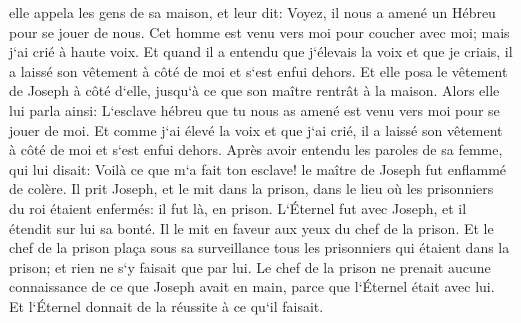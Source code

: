 \verse elle appela les gens de sa maison, et leur dit: Voyez, il nous a amené un Hébreu pour se jouer de nous. Cet homme est venu vers moi pour coucher avec moi; mais j`ai crié à haute voix. 
\verse Et quand il a entendu que j`élevais la voix et que je criais, il a laissé son vêtement à côté de moi et s`est enfui dehors. 
\verse Et elle posa le vêtement de Joseph à côté d`elle, jusqu`à ce que son maître rentrât à la maison. 
\verse Alors elle lui parla ainsi: L`esclave hébreu que tu nous as amené est venu vers moi pour se jouer de moi. 
\verse Et comme j`ai élevé la voix et que j`ai crié, il a laissé son vêtement à côté de moi et s`est enfui dehors. 
\verse Après avoir entendu les paroles de sa femme, qui lui disait: Voilà ce que m`a fait ton esclave! le maître de Joseph fut enflammé de colère. 
\verse Il prit Joseph, et le mit dans la prison, dans le lieu où les prisonniers du roi étaient enfermés: il fut là, en prison. 
\verse L`Éternel fut avec Joseph, et il étendit sur lui sa bonté. Il le mit en faveur aux yeux du chef de la prison. 
\verse Et le chef de la prison plaça sous sa surveillance tous les prisonniers qui étaient dans la prison; et rien ne s`y faisait que par lui. 
\verse Le chef de la prison ne prenait aucune connaissance de ce que Joseph avait en main, parce que l`Éternel était avec lui. Et l`Éternel donnait de la réussite à ce qu`il faisait. 

